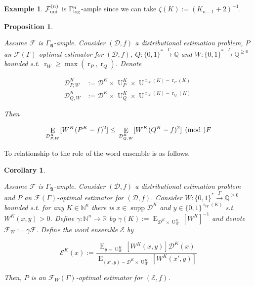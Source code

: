 \documentclass{article}
\numberwithin{equation}{section}
\theoremstyle{definition}
\newtheorem{example}{Example}[section]
\theoremstyle{plain}
\newtheorem{proposition}{Proposition}[section]
\newtheorem{corollary}{Corollary}[section]
\newcommand{\Bool}{\{0,1\}}
\newcommand{\Words}{{\Bool^*}}
\newcommand{\WordsLen}[1]{{\Bool^{#1}}}
\DeclareMathOperator{\Supp}{supp}
\DeclareMathOperator{\E}{E}
\DeclareMathOperator{\R}{r}
\DeclareMathOperator{\Un}{U}
\newcommand{\Nats}{\mathbb{N}}
\newcommand{\Rats}{\mathbb{Q}}
\newcommand{\Reals}{\mathbb{R}}
\newcommand{\NatFun}{\Nats^n \rightarrow}
\newcommand{\Dist}{\mathcal{D}}
\newcommand{\GrowA}{\Gamma_{\mathfrak{A}}}
\newcommand{\Fall}{\mathcal{F}}
\newcommand{\EG}{\Fall(\Gamma)}
\newcommand{\GammaLog}{\Gamma_{\textnormal{log}}}
\newcommand{\FallU}{{\Fall_{\textnormal{uni}}^{(n)}}}
\newcommand{\Scheme}{\xrightarrow{\Gamma}}
\begin{document}
\begin{samepage}
\begin{example}

${\FallU}$ is ${\GammaLog^n}$-ample since we can take ${\zeta(K):=(K_{n-1}+2)^{-1}}$.

\end{example}
\end{samepage}

\begin{proposition}
\label{prp:weight}

Assume $\Fall$ is $\GrowA$-ample. Consider $(\Dist,f)$ a distributional estimation problem, $P$ an $\EG$-optimal estimator for $(\Dist,f)$, $Q: \Words \Scheme \Rats$ and ${W: \Words \Scheme \Rats^{\geq 0}}$ bounded s.t. ${\R_W \geq \max(\R_P, \R_Q)}$. Denote 

\begin{align*}
\Dist^{K}_{P,W} &:=\Dist^{K} \times \Un_P^{K} \times \Un^{\R_W(K)-\R_P(K)} \\
\Dist^{K}_{Q,W} &:=\Dist^{K} \times \Un_Q^{K} \times \Un^{\R_W(K)-\R_Q(K)}
\end{align*}

Then

\begin{equation}
\E_{\Dist^{K}_{P,W}}[W^{K}(P^{K} - f)^2] \leq \\ \E_{\Dist^{K}_{Q,W}}[W^{K}(Q^{K} - f)^2] \pmod \Fall
\end{equation}

\end{proposition}

To relationship to the role of the word ensemble is as follows.

\begin{samepage}
\begin{corollary}
\label{crl:weight}

Assume $\Fall$ is $\GrowA$-ample. Consider $(\Dist,f)$ a distributional estimation problem and $P$ an $\EG$-optimal estimator for $(\Dist,f)$. Consider ${W: \Words \Scheme \Rats^{\geq 0}}$ bounded s.t. for any $K \in \Nats^n$ there is $x \in \Supp \Dist^K$ and $y \in \WordsLen{\R_W(K)}$ s.t. $W^K(x,y) > 0$. Define ${\gamma: \NatFun \Reals}$ by ${\gamma(K):=\E_{\Dist^K \times \Un_W^K}[W^K]^{-1}}$ and denote ${\Fall_W:= \gamma\Fall}$. Define the word ensemble $\mathcal{E}$ by 

\[\mathcal{E}^K(x):=\frac{\E_{y \sim \Un_W^K}[W^K(x,y)] \Dist^K(x)}{\E_{(x',y) \sim \Dist^K \times \Un_W^K}[W^K(x',y)]}\]

Then, $P$ is an $\Fall_W(\Gamma)$-optimal estimator for $(\mathcal{E},f)$.

\end{corollary}
\end{samepage}
\end{document}
